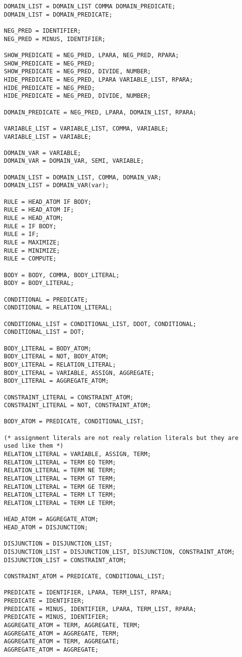 \begin{verbatim}
DOMAIN_LIST = DOMAIN_LIST COMMA DOMAIN_PREDICATE;
DOMAIN_LIST = DOMAIN_PREDICATE;

NEG_PRED = IDENTIFIER;
NEG_PRED = MINUS, IDENTIFIER;

SHOW_PREDICATE = NEG_PRED, LPARA, NEG_PRED, RPARA;
SHOW_PREDICATE = NEG_PRED;
SHOW_PREDICATE = NEG_PRED, DIVIDE, NUMBER;
HIDE_PREDICATE = NEG_PRED, LPARA VARIABLE_LIST, RPARA;
HIDE_PREDICATE = NEG_PRED;
HIDE_PREDICATE = NEG_PRED, DIVIDE, NUMBER;

DOMAIN_PREDICATE = NEG_PRED, LPARA, DOMAIN_LIST, RPARA;

VARIABLE_LIST = VARIABLE_LIST, COMMA, VARIABLE;
VARIABLE_LIST = VARIABLE;

DOMAIN_VAR = VARIABLE;
DOMAIN_VAR = DOMAIN_VAR, SEMI, VARIABLE;

DOMAIN_LIST = DOMAIN_LIST, COMMA, DOMAIN_VAR;
DOMAIN_LIST = DOMAIN_VAR(var);

RULE = HEAD_ATOM IF BODY;
RULE = HEAD_ATOM IF;
RULE = HEAD_ATOM;
RULE = IF BODY;
RULE = IF;
RULE = MAXIMIZE;
RULE = MINIMIZE;
RULE = COMPUTE;

BODY = BODY, COMMA, BODY_LITERAL;
BODY = BODY_LITERAL;

CONDITIONAL = PREDICATE;
CONDITIONAL = RELATION_LITERAL;

CONDITIONAL_LIST = CONDITIONAL_LIST, DDOT, CONDITIONAL;
CONDITIONAL_LIST = DOT;

BODY_LITERAL = BODY_ATOM;
BODY_LITERAL = NOT, BODY_ATOM;
BODY_LITERAL = RELATION_LITERAL;
BODY_LITERAL = VARIABLE, ASSIGN, AGGREGATE;
BODY_LITERAL = AGGREGATE_ATOM;

CONSTRAINT_LITERAL = CONSTRAINT_ATOM;
CONSTRAINT_LITERAL = NOT, CONSTRAINT_ATOM;

BODY_ATOM = PREDICATE, CONDITIONAL_LIST;

(* assignment literals are not realy relation literals but they are used like them *)
RELATION_LITERAL = VARIABLE, ASSIGN, TERM;
RELATION_LITERAL = TERM EQ TERM;
RELATION_LITERAL = TERM NE TERM;
RELATION_LITERAL = TERM GT TERM;
RELATION_LITERAL = TERM GE TERM;
RELATION_LITERAL = TERM LT TERM;
RELATION_LITERAL = TERM LE TERM;

HEAD_ATOM = AGGREGATE_ATOM;
HEAD_ATOM = DISJUNCTION;

DISJUNCTION = DISJUNCTION_LIST;
DISJUNCTION_LIST = DISJUNCTION_LIST, DISJUNCTION, CONSTRAINT_ATOM;
DISJUNCTION_LIST = CONSTRAINT_ATOM;

CONSTRAINT_ATOM = PREDICATE, CONDITIONAL_LIST;

PREDICATE = IDENTIFIER, LPARA, TERM_LIST, RPARA;
PREDICATE = IDENTIFIER;
PREDICATE = MINUS, IDENTIFIER, LPARA, TERM_LIST, RPARA;
PREDICATE = MINUS, IDENTIFIER;
AGGREGATE_ATOM = TERM, AGGREGATE, TERM;
AGGREGATE_ATOM = AGGREGATE, TERM;
AGGREGATE_ATOM = TERM, AGGREGATE;
AGGREGATE_ATOM = AGGREGATE;


\end{verbatim}

